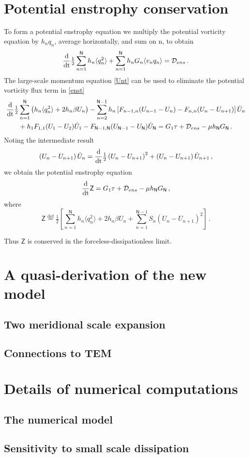 \documentclass{jfm}
\newcommand{\defn}{\ensuremath{\stackrel{\mathrm{def}}{=}}}
\def\beq{\begin{equation}}
\def\eeq{\end{equation}}
\newcommand{\com}{\, ,}
\newcommand{\per}{\, .}
\newcommand{\avxy}[1]{\langle{#1}\rangle}
\newcommand{\nmax}{\mathsf{N}}
\newcommand{\dissens}{\mathcal{D}_{ens}}
\newcommand{\dd}{\rm d}
\newcommand{\half}{\tfrac{1}{2}}
\newcommand{\sZ}{\mathsf{Z}}
\begin{document}
\section{Potential enstrophy conservation}\label{appEns}
To form a potential enstrophy equation we multiply the potential vorticity equation
by $h_n q_n$, average horizontally, and sum on n, to obtain
\beq \label{enst}
\frac{\dd}{\dd t}\half \sum_{n=1}^{\nmax} h_n \avxy{q_n^2} +
\sum_{n=1}^{\nmax} h_n G_n \avxy{v_n q_n} = \dissens\per
\eeq
The large-scale momentum equation \eqref{Unt} can be used to eliminate the
potential vorticity flux term in \eqref{enst}
\begin{align}\label{enst2}
\frac{\dd}{\dd t}\half &\sum_{n=1}^{\nmax} \left(h_n \avxy{q_n^2} + 2 h_n \beta U_n\right)
 - \sum_{n=2}^{\nmax-1} h_n \left[F_{n-1,n}(U_{n-1}-U_n) - F_{n,n}(U_n - U_{n+1})
\right]{\dot U_n} \nonumber \\&+ h_1 F_{1,1}(U_1-U_2){\dot U_1}
- F_{\nmax-1,\nmax}(U_{\nmax-1} -U_\nmax){\dot U_\nmax}
= G_1 \tau + \dissens - \mu h_\nmax G_\nmax \per
\end{align}
Noting the intermediate result
\beq \label{interUt}
\left(U_n - U_{n+1}\right)\dot{U}_n = \frac{\dd}{\dd t} \half
\left(U_n - U_{n+1}\right)^2 +  \left(U_n - U_{n+1}\right)\dot{U}_{n+1}\com
\eeq
we obtain the potential enstrophy equation
\beq\label{Zeqn}
\frac{\dd}{\dd t} \sZ  = G_1 \tau + \dissens - \mu h_\nmax G_\nmax\com
\eeq
where
\beq\label{Zdefn}
\sZ \defn \half \left[\sum_{n=1}^{\nmax} h_n \avxy{q_n^2} + 2 h_n \beta U_n
+ \sum_{n=1}^{\nmax-1} S_n (U_n - U_{n+1})^2\right]\per
\eeq

Thus $\sZ$ is conserved in the forceless-dissipationless limit.

\section{A quasi-derivation of the new model}\label{appE}

\subsection{Two meridional scale expansion}

\subsection{Connections to TEM}


\section{Details of numerical computations}\label{num}

\subsection{The numerical model}

\subsection{Sensitivity to small scale dissipation}



\end{document}
